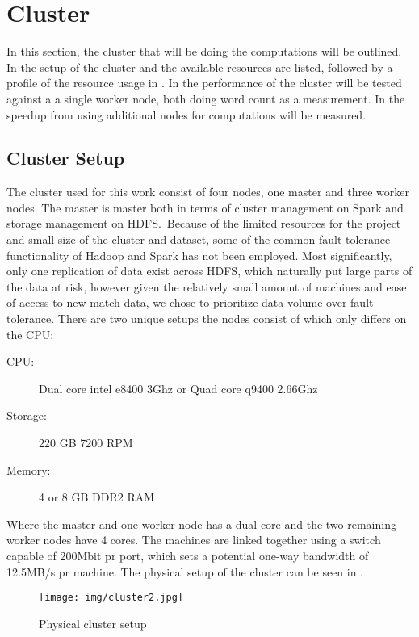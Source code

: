 \section{Cluster}\label{sec:cluster}
In this section, the cluster that will be doing the computations will be outlined. In  the setup of the cluster and the available resources are listed, followed by a profile of the resource usage in . In  the performance of the cluster will be tested against a a single worker node, both doing word count as a measurement. In  the speedup from using additional nodes for computations will be measured.

\subsection{Cluster Setup}\label{sec:clustersetup}

The cluster used for this work consist of four nodes, one master and three worker nodes. The master is master both in terms of cluster management on Spark and storage management on HDFS.\ Because of the limited resources for the project and small size of the cluster and dataset, some of the common fault tolerance functionality of Hadoop and Spark has not been employed. Most significantly, only one replication of data exist across HDFS, which naturally put large parts of the data at risk, however given the relatively small amount of machines and ease of access to new match data, we chose to prioritize data volume over fault tolerance. There are two unique setups the nodes consist of which only differs on the CPU:\@
\begin{description}
\item[CPU:] Dual core intel e8400 3Ghz or Quad core q9400 2.66Ghz
\item[Storage:] 220 GB 7200 RPM
\item[Memory:] 4 or 8 GB DDR2 RAM
\end{description}

Where the master and one worker node has a dual core and the two remaining worker nodes have 4 cores. The machines are linked together using a switch capable of 200Mbit pr port, which sets a potential one-way bandwidth of 12.5MB/s pr machine. The physical setup of the cluster can be seen in .

\begin{figure}[!htb]
  \centering
    \texttt{[image: img/cluster2.jpg]}
  \caption{Physical cluster setup}\label{fig:clustersetup}
\end{figure}

